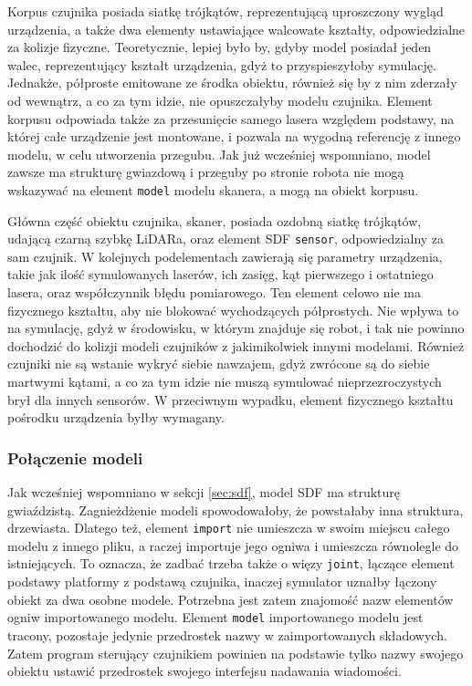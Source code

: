 		Korpus czujnika posiada siatkę trójkątów, reprezentującą uproszczony wygląd urządzenia, a także dwa elementy ustawiające walcowate kształty, odpowiedzialne za kolizje fizyczne.
		Teoretycznie, lepiej było by, gdyby model posiadał jeden walec, reprezentujący kształt urządzenia, gdyż to przyspieszyłoby symulację. 
		Jednakże, półproste emitowane ze środka obiektu, również się by z nim zderzały od wewnątrz, a co za tym idzie, nie opuszczałyby modelu czujnika.
		Element korpusu odpowiada także za przesunięcie samego lasera względem podstawy, na której całe urządzenie jest montowane, i 
		pozwala na wygodną referencję z innego modelu, w celu utworzenia przegubu.
		Jak już wcześniej wspomniano, model zawsze ma strukturę gwiazdową i przeguby po stronie robota nie mogą wskazywać na element \texttt{model} modelu skanera, a mogą
		na obiekt korpusu.

		Główna część obiektu czujnika, skaner, posiada ozdobną siatkę trójkątów, udającą czarną szybkę LiDARa, oraz element SDF \texttt{sensor}, odpowiedzialny za sam czujnik.
		W kolejnych podelementach zawierają się parametry urządzenia, takie jak ilość symulowanych laserów, ich zasięg, kąt pierwszego i ostatniego lasera, oraz współczynnik błędu pomiarowego. Ten element celowo nie ma fizycznego kształtu, aby nie blokować wychodzących półprostych. 
		Nie wpływa to na symulację, gdyż w środowisku, w którym znajduje się robot, i tak nie powinno dochodzić do kolizji modeli czujników z jakimikolwiek innymi modelami.
		Również czujniki nie są wstanie wykryć siebie nawzajem, gdyż zwrócone są do siebie martwymi kątami, a co za tym idzie nie muszą symulować nieprzezroczystych brył dla
		innych sensorów.
		W przeciwnym wypadku, element fizycznego kształtu pośrodku urządzenia byłby wymagany.

		\subsubsection{Połączenie modeli}
			Jak wcześniej wspomniano w sekcji \ref{sec:sdf},
			model SDF ma strukturę gwiaździstą. 
			Zagnieżdżenie modeli spowodowałoby, że powstałaby inna struktura, drzewiasta.
			Dlatego też, element \texttt{import} nie umieszcza w swoim miejscu całego modelu z innego pliku, a raczej importuje jego ogniwa i umieszcza równolegle do istniejących.
			To oznacza, że zadbać trzeba także o więzy \texttt{joint}, łączące element podstawy platformy z podstawą czujnika, inaczej symulator uznałby łączony obiekt za dwa osobne modele.
			Potrzebna jest zatem znajomość nazw elementów ogniw importowanego modelu.
			Element \texttt{model} importowanego modelu jest tracony, pozostaje jedynie przedrostek nazwy w zaimportowanych składowych.
			Zatem program sterujący czujnikiem powinien na podstawie tylko nazwy swojego obiektu ustawić przedrostek swojego interfejsu nadawania wiadomości.


